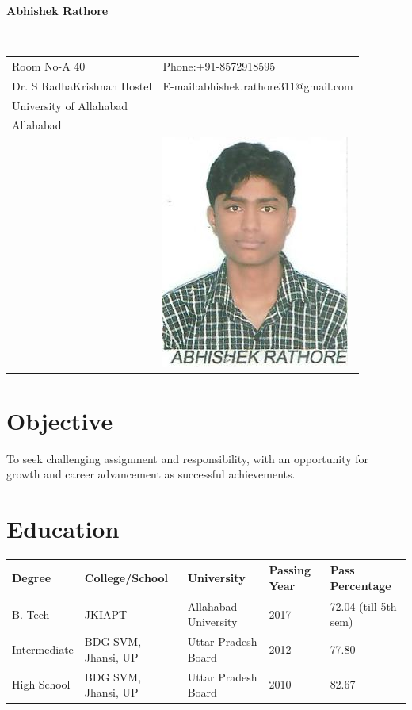 \documentclass[12pt]{article}
\begin{document}
\vspace{0.5in}
\begin{center}\begin{large}\textbf{Abhishek Rathore}\end{large}\end{center}\textbf{\hrulefill}\\

\begin{tabular}{@{}p{4in}p{3in}}
Room No-A 40 & {Phone:}+91-8572918595 \\
Dr. S RadhaKrishnan Hostel & {E-mail:}abhishek.rathore311@gmail.com\\
University of Allahabad \\
Allahabad\\
& \includegraphics[scale=0.8]{Abhishek_Rathore_Photo.jpg}\\
\end{tabular}

\section*{Objective}
To seek challenging assignment and responsibility, with an opportunity for growth and career advancement as successful achievements.
\section*{Education}
\begin{tabular}{|l|l|l|l|l|}
\hline
Degree & College/School & University & Passing Year & Pass Percentage\\
\hline
B. Tech & JKIAPT & Allahabad University & 2017 & 72.04 (till 5th sem)\\
\hline
Intermediate & BDG SVM, Jhansi, UP & Uttar Pradesh Board & 2012 & 77.80\\
\hline
High School & BDG SVM, Jhansi, UP & Uttar Pradesh Board & 2010 & 82.67\\
\hline
\end{tabular}
\end{document}
